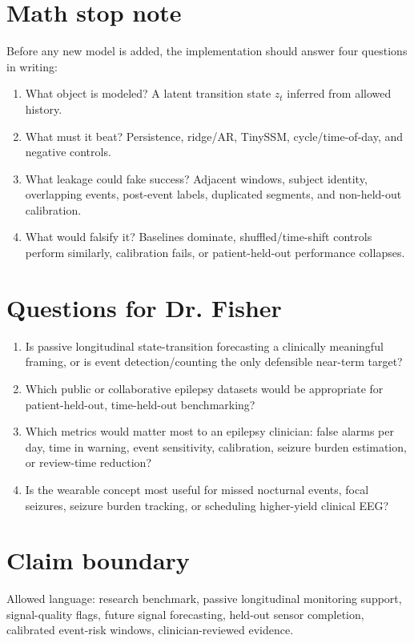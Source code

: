 \documentclass[10pt]{article}
\begin{document}
\section*{Math stop note}
Before any new model is added, the implementation should answer four questions in writing:
\begin{enumerate}
  \item What object is modeled? A latent transition state $z_t$ inferred from allowed history.
  \item What must it beat? Persistence, ridge/AR, TinySSM, cycle/time-of-day, and negative controls.
  \item What leakage could fake success? Adjacent windows, subject identity, overlapping events, post-event labels, duplicated segments, and non-held-out calibration.
  \item What would falsify it? Baselines dominate, shuffled/time-shift controls perform similarly, calibration fails, or patient-held-out performance collapses.
\end{enumerate}

\section*{Questions for Dr. Fisher}
\begin{enumerate}
  \item Is passive longitudinal state-transition forecasting a clinically meaningful framing, or is event detection/counting the only defensible near-term target?
  \item Which public or collaborative epilepsy datasets would be appropriate for patient-held-out, time-held-out benchmarking?
  \item Which metrics would matter most to an epilepsy clinician: false alarms per day, time in warning, event sensitivity, calibration, seizure burden estimation, or review-time reduction?
  \item Is the wearable concept most useful for missed nocturnal events, focal seizures, seizure burden tracking, or scheduling higher-yield clinical EEG?
\end{enumerate}

\section*{Claim boundary}
Allowed language: research benchmark, passive longitudinal monitoring support, signal-quality flags, future signal forecasting, held-out sensor completion, calibrated event-risk windows, clinician-reviewed evidence.
\end{document}
